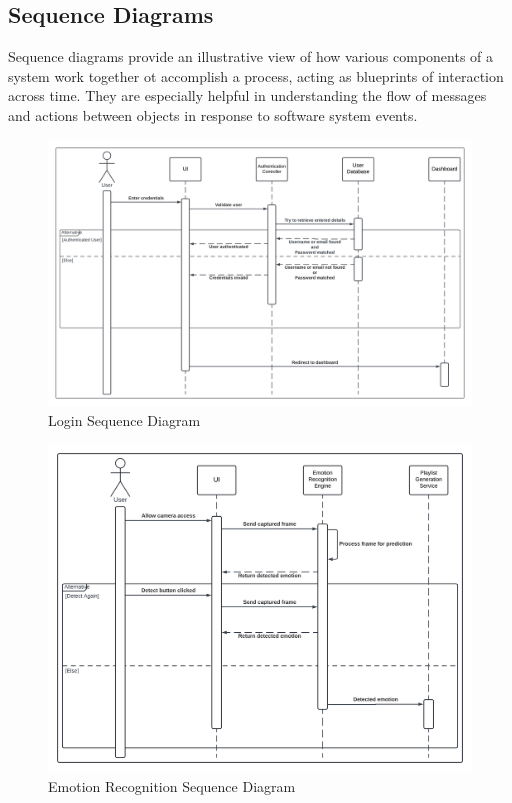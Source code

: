 \subsection{Sequence Diagrams}
Sequence diagrams provide an illustrative view of how various components of a system work together ot accomplish a process, acting as blueprints of interaction across time.\citep{bell_2004_explore}
They are especially helpful in understanding the flow of messages and actions between objects in response to software system events.
\begin{figure}[!ht]
    \centering
    \includegraphics[width=14cm]{Images/login-sequence.png}
    \caption{Login Sequence Diagram}
    \label{fig:login-sequence}
\end{figure}
\begin{figure}[!ht]
    \centering
    \includegraphics[width=14cm]{Images/fer-sequence.png}
    \caption{Emotion Recognition Sequence Diagram}
    \label{fig:fer-sequence}
\end{figure}
